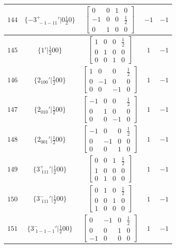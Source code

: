 \documentclass[fleqn,8pt]{jsarticle}
\begin{document}
\begin{longtable}{ccccc}
$ 144 $ & $ \{-3^{+}_{\,\,-1-11}{}'|0 \frac{1}{2} 0\} $ & $ \begin{bmatrix} 0 & 0 & 1 & 0 \\ -1 & 0 & 0 & \frac{1}{2} \\ 0 & 1 & 0 & 0 \end{bmatrix} $ & $ -1 $ & $ -1 $ \\ \hline
$ 145 $ & $ \{1{}'|\frac{1}{2} 0 0\} $ & $ \begin{bmatrix} 1 & 0 & 0 & \frac{1}{2} \\ 0 & 1 & 0 & 0 \\ 0 & 0 & 1 & 0 \end{bmatrix} $ & $ 1 $ & $ -1 $ \\ \hline
$ 146 $ & $ \{2{}_{100}{}'|\frac{1}{2} 0 0\} $ & $ \begin{bmatrix} 1 & 0 & 0 & \frac{1}{2} \\ 0 & -1 & 0 & 0 \\ 0 & 0 & -1 & 0 \end{bmatrix} $ & $ 1 $ & $ -1 $ \\ \hline
$ 147 $ & $ \{2{}_{010}{}'|\frac{1}{2} 0 0\} $ & $ \begin{bmatrix} -1 & 0 & 0 & \frac{1}{2} \\ 0 & 1 & 0 & 0 \\ 0 & 0 & -1 & 0 \end{bmatrix} $ & $ 1 $ & $ -1 $ \\ \hline
$ 148 $ & $ \{2{}_{001}{}'|\frac{1}{2} 0 0\} $ & $ \begin{bmatrix} -1 & 0 & 0 & \frac{1}{2} \\ 0 & -1 & 0 & 0 \\ 0 & 0 & 1 & 0 \end{bmatrix} $ & $ 1 $ & $ -1 $ \\ \hline
$ 149 $ & $ \{3^{+}_{\,\,111}{}'|\frac{1}{2} 0 0\} $ & $ \begin{bmatrix} 0 & 0 & 1 & \frac{1}{2} \\ 1 & 0 & 0 & 0 \\ 0 & 1 & 0 & 0 \end{bmatrix} $ & $ 1 $ & $ -1 $ \\ \hline
$ 150 $ & $ \{3^{-}_{\,\,111}{}'|\frac{1}{2} 0 0\} $ & $ \begin{bmatrix} 0 & 1 & 0 & \frac{1}{2} \\ 0 & 0 & 1 & 0 \\ 1 & 0 & 0 & 0 \end{bmatrix} $ & $ 1 $ & $ -1 $ \\ \hline
$ 151 $ & $ \{3^{-}_{\,\,1-1-1}{}'|\frac{1}{2} 0 0\} $ & $ \begin{bmatrix} 0 & -1 & 0 & \frac{1}{2} \\ 0 & 0 & 1 & 0 \\ -1 & 0 & 0 & 0 \end{bmatrix} $ & $ 1 $ & $ -1 $ \\ \hline

\end{longtable}
\end{document}
